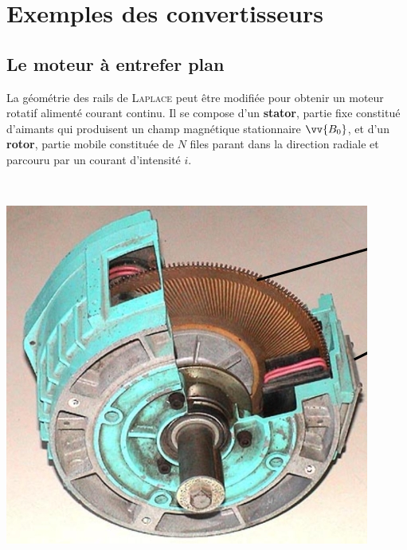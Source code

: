 \documentclass[../../main/main.tex]{subfiles}
\begin{document}
\section{Exemples des convertisseurs}
\label{sec:exconv}
\subsection{Le moteur à entrefer plan}
\label{ssec:motentrefer}

La géométrie des rails de \textsc{Laplace} peut être modifiée pour obtenir un
moteur rotatif alimenté courant continu. Il se compose d'un \textbf{stator},
partie fixe constitué d'aimants qui produisent un champ magnétique stationnaire
$\vv{B_0}$, et d'un \textbf{rotor}, partie mobile constituée de $N$ files parant
dans la direction radiale et parcouru par un courant d'intensité $i$.
\smallbreak
\noindent
\hfill
\begin{minipage}[t]{.30\linewidth}
	~
	\begin{center}
		\includegraphics[scale=1.3]{mot_entrefer-phot}
		\label{fig:motphoto}
	\end{center}
\end{minipage}
\hfill
\end{document}
